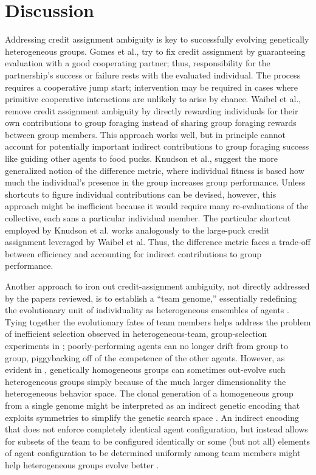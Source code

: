 \section{Discussion}

Addressing credit assignment ambiguity is key to successfully evolving genetically heterogeneous groups.
Gomes et al., try to fix credit assignment by guaranteeing evaluation with a good cooperating partner;
thus, responsibility for the partnership's success or failure rests with the evaluated individual.
The process requires a cooperative jump start; intervention may be required in cases where primitive cooperative interactions are unlikely to arise by chance.
Waibel et al., remove credit assignment ambiguity by directly rewarding individuals for their own contributions to group foraging instead of sharing group foraging rewards between group members.
This approach works well, but in principle cannot account for potentially important indirect contributions to group foraging success like guiding other agents to food pucks.
Knudson et al., suggest the more generalized notion of the difference metric, where individual fitness is based how much the individual's presence in the group increases group performance.
Unless shortcuts to figure individual contributions can be devised, however, this approach might be inefficient because it would require many re-evaluations of the collective, each sans a particular individual member.
The particular shortcut employed by Knudson et al. works analogously to the large-puck credit assignment leveraged by Waibel et al.
Thus, the difference metric faces a trade-off between efficiency and accounting for indirect contributions to group performance.

Another approach to iron out credit-assignment ambiguity, not directly addressed by the papers reviewed, is to establish a ``team genome,'' essentially redefining the evolutionary unit of individuality as heterogeneous ensembles of agents \cite{miconi2003evolving}.
Tying together the evolutionary fates of team members helps address the problem of inefficient selection observed in heterogeneous-team, group-selection experiments in \cite{waibel2009genetic};
poorly-performing agents can no longer drift from group to group, piggybacking off of the competence of the other agents.
However, as evident in \cite{waibel2009genetic}, genetically homogeneous groups can sometimes out-evolve such heterogeneous groups simply because of the much larger dimensionality the heterogeneous behavior space.
The clonal generation of a homogeneous group from a single genome might be interpreted as an indirect genetic encoding that exploits symmetries to simplify the genetic search space \cite{clune2011performance}.
An indirect encoding that does not enforce completely identical agent configuration, but instead allows for subsets of the team to be configured identically or some (but not all) elements of agent configuration to be determined uniformly among team members might help heterogeneous groups evolve better \cite{bongard2000legion}.

